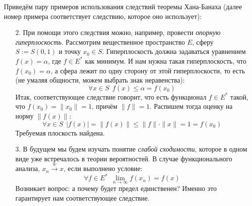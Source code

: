\begin{example}
	Приведём пару примеров использования следствий теоремы Хана-Банаха (далее номер примера соответствует следствию, которое оно использует):
	\begin{enumerate}
		\item[2.] При помощи этого следствия можно, например, провести \textit{опорную гиперплоскость}. Рассмотрим вещественное пространство $E$, сферу $S := S(0, 1)$ и точку $x_0 \in S$. Гиперплоскость должна задаваться уравнением $f(x) = \alpha$, где $f \in E^*$ как минимум. И нам нужна такая гиперплоскость, что $f(x_0) = \alpha$, а сфера лежит по одну сторону от этой гиперплоскости, то есть (не умаляя общности, можем выбрать знак неравенства):
		\[
			\forall x \in S\ \ f(x) \le \alpha = f(x_0)
		\]
		Итак, соответствующее следствие говорит, что есть функционал $f \in E^*$ такой, что $f(x_0) = \|x_0\| = 1$, причём $\|f\| = 1$. Распишем тогда оценку на норму $\|f(x)\|$:
		\[
			\forall x \in S\ \ |f(x)| = \|f(x)\| \le \|f\| \cdot \|x\| = 1 = f(x_0)
		\]
		Требуемая плоскость найдена.
		
		\item[3.] В будущем мы будем изучать понятие \textit{слабой сходимости}, которое в одном виде уже встречалось в теории вероятностей. В случае функционального анализа, $x_n \xrightarrow{w} x$, если выполнено условие:
		\[
			\forall f \in E^*\ \ \lim_{n \to \infty} f(x_n) = f(x)
		\]
		Возникает вопрос: а почему будет предел единственен? Именно это гарантирует нам соответствующее следствие.
	\end{enumerate}
\end{example}